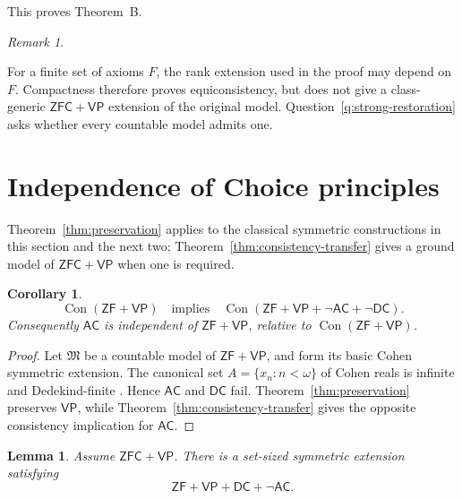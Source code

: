 \documentclass[11pt,a4paper]{amsart}
\newcommand{\VP}{\mathsf{VP}}
\newcommand{\AC}{\mathsf{AC}}
\newcommand{\ZF}{\mathsf{ZF}}
\newcommand{\ZFC}{\mathsf{ZFC}}
\newcommand{\Con}{\operatorname{Con}}
\newcommand{\DC}{\mathsf{DC}}
\theoremstyle{plain}
\newtheorem{lemma}[theorem]{Lemma}
\newtheorem{corollary}[theorem]{Corollary}
\theoremstyle{definition}
\theoremstyle{remark}
\newtheorem{remark}[theorem]{Remark}
\begin{document}
This proves Theorem~B.

\begin{remark}\label{rem:consistency-not-uniform}

For a finite set of axioms $F$, the rank extension used in the proof may depend on $F$.  Compactness therefore proves equiconsistency, but does not give a class-generic $\ZFC+\VP$ extension of the original model.  Question~\ref{q:strong-restoration} asks whether every countable model admits one.
\end{remark}
\endgroup

\section{{Independence of Choice principles}}

Theorem~\ref{thm:preservation} applies to the classical symmetric constructions in this section and the next two; Theorem~\ref{thm:consistency-transfer} gives a ground model of $\ZFC+\VP$ when one is required.

\begin{corollary}\label{cor:choice}
\[
\Con(\ZF+\VP)\quad\text{implies}\quad
\Con(\ZF+\VP+\neg\AC+\neg\DC).
\]
Consequently $\AC$ is independent of $\ZF+\VP$, relative to $\Con(\ZF+\VP)$.
\end{corollary}

\begin{proof}
Let $\mathfrak M$ be a countable model of $\ZF+\VP$, and form its basic Cohen symmetric extension.  The canonical set $A=\{x_n:n<\omega\}$ of Cohen reals is infinite and Dedekind-finite \cite[Section~5.3]{Jech}.  Hence $\AC$ and $\DC$ fail.  Theorem~\ref{thm:preservation} preserves $\VP$, while Theorem~\ref{thm:consistency-transfer} gives the opposite consistency implication for $\AC$.
\end{proof}

\begingroup

\begin{lemma}\label{lem:omega1-Cohen}
Assume $\ZFC+\VP$.  There is a set-sized symmetric extension satisfying
\[
\ZF+\VP+\DC+\neg\AC.
\]
\end{lemma}
\end{document}
